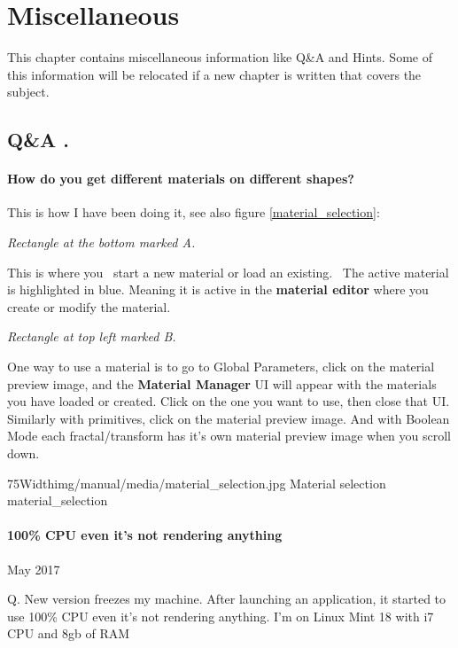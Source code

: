 \section{Miscellaneous}\label{miscellaneous}

This chapter contains miscellaneous information like  Q\&A and Hints. Some of this information will be relocated if a new chapter is written that covers the subject.


\subsection{Q\&A . }\label{Q|&A}

\paragraph{How do you get different materials on different
	shapes?}

This is how I have been doing it, see also figure \ref{material_selection}:

\emph{Rectangle at the bottom marked A.}

This is where you~ start a new material or load an
existing.~ The active material is highlighted in blue. Meaning it is active in
the \textbf{material editor} where you create or modify the material.

\emph{Rectangle at top left marked B.}

One way to use a material is to go to Global Parameters,
click on the material preview image, and the \textbf{Material Manager} UI will
appear with the materials you have loaded or created. Click on the one you want
to use, then close that UI.\\ Similarly with primitives, click on the material
preview image. And with Boolean Mode each fractal/transform has it's own
material preview image when you scroll down.

\simpleImageWithCaption75Width{img/manual/media/material_selection.jpg}
{Material selection}
{material_selection}


\paragraph{100\% CPU even it's not rendering anything} May 2017

Q. New version freezes my machine. After launching an application, it started  to use 100\% CPU even it's not rendering anything.
I'm on Linux Mint 18 with i7 CPU and 8gb of RAM

